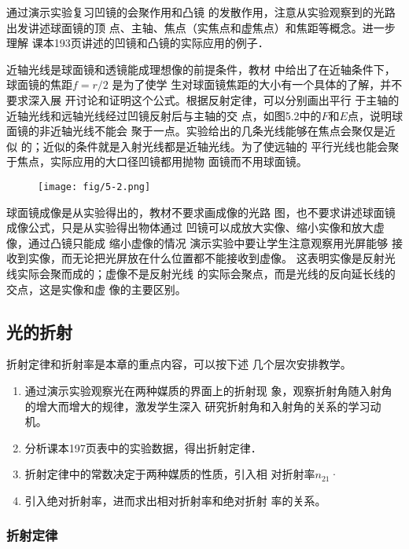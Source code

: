 通过演示实验复习凹镜的会聚作用和凸镜
的发散作用，注意从实验观察到的光路出发讲述球面镜的顶
点、主轴、焦点（实焦点和虚焦点）和焦距等概念。进一步理解
课本193页讲述的凹镜和凸镜的实际应用的例子．

近轴光线是球面镜和透镜能成理想像的前提条件，教材
中给出了在近轴条件下，球面镜的焦距$f=r/2$
是为了使学
生对球面镜焦距的大小有一个具体的了解，并不要求深入展
开讨论和证明这个公式。根据反射定律，可以分别画出平行
于主轴的近轴光线和远轴光线经过凹镜反射后与主轴的交
点，如图5.2中的$F$和$E$点，说明球面镜的非近轴光线不能会
聚于一点。实验给出的几条光线能够在焦点会聚仅是近似
的；近似的条件就是入射光线都是近轴光线。为了使远轴的
平行光线也能会聚于焦点，实际应用的大口径凹镜都用抛物
面镜而不用球面镜。
\begin{figure}[htp]
    \centering
    \texttt{[image: fig/5-2.png]}
    \caption{}
\end{figure}

球面镜成像是从实验得出的，教材不要求画成像的光路
图，也不要求讲述球面镜成像公式，只是从实验得出物体通过
凹镜可以成放大实像、缩小实像和放大虚像，通过凸镜只能成
缩小虚像的情况 演示实验中要让学生注意观察用光屏能够
接收到实像，而无论把光屏放在什么位置都不能接收到虚像。
这表明实像是反射光线实际会聚而成的；虚像不是反射光线
的实际会聚点，而是光线的反向延长线的交点，这是实像和虚
像的主要区别。


\subsection{光的折射}

折射定律和折射率是本章的重点内容，可以按下述
几个层次安排教学。
\begin{enumerate}
\item 通过演示实验观察光在两种媒质的界面上的折射现
象，观察折射角随入射角的增大而增大的规律，激发学生深入
研究折射角和入射角的关系的学习动机。
\item 分析课本197页表中的实验数据，得出折射定律．
\item 折射定律中的常数决定于两种媒质的性质，引入相
对折射率$n_{21}$·
\item 引入绝对折射率，进而求出相对折射率和绝对折射
率的关系。
\end{enumerate}

\subsubsection{折射定律}

